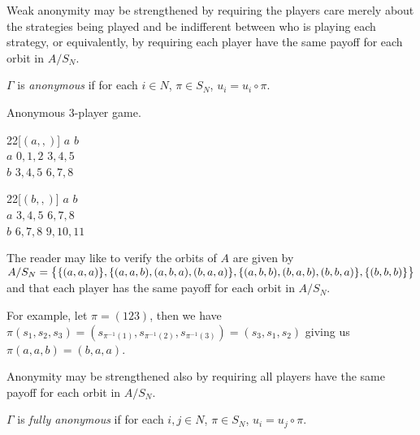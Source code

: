 Weak anonymity may be strengthened by requiring the players care merely about the strategies being played and be indifferent between who is playing each strategy, or equivalently, by requiring each player have the same payoff for each orbit in $A/S_N$.

\begin{definition}
	$\Gamma$ is \textit{anonymous} if for each $i \in N$, $\pi \in S_N$, $u_i = u_i \circ \pi$. 
\end{definition}

\begin{example} \label{anoneg}
		Anonymous 3-player game.
		\begin{center}
		\begin{game}{2}{2}[$(a,,)$]
			      \> $a$      \> $b$ \\
			$a$   \> $0,1,2$  \> $3,4,5$ \\
			$b$   \> $3,4,5$  \> $6,7,8$
		\end{game}
		\hspace*{10mm} 
		\begin{game}{2}{2}[$(b,,)$]
			      \> $a$     \> $b$ \\
			$a$   \> $3,4,5$ \> $6,7,8$ \\
			$b$   \> $6,7,8$ \> $9,10,11$
		\end{game}
		\end{center}
		The reader may like to verify the orbits of $A$ are given by $A/S_N = \bigl\{\{(a,a,a)\}, \newline\{(a,a,b), (a,b,a), (b,a,a)\}, \{(a,b,b), (b,a,b), (b,b,a)\}, \{(b,b,b)\}\bigr\}$ and that each player has the same payoff for each orbit in $A/S_N$. 
		
		For example, let $\pi = (123)$, then we have $\pi(s_1, s_2, s_3) = (s_{\pi^{-1}(1)}, s_{\pi^{-1}(2)}, s_{\pi^{-1}(3)}) = (s_3, s_1, s_2)$ giving us $\pi(a,a,b) = (b,a,a)$.
	\end{example}
	
Anonymity may be strengthened also by requiring all players have the same payoff for each orbit in $A/S_N$.
	
\begin{definition}
	$\Gamma$ is \textit{fully anonymous} if for each $i, j \in N$, $\pi \in S_N$, $u_i = u_j \circ \pi$. 
\end{definition}

